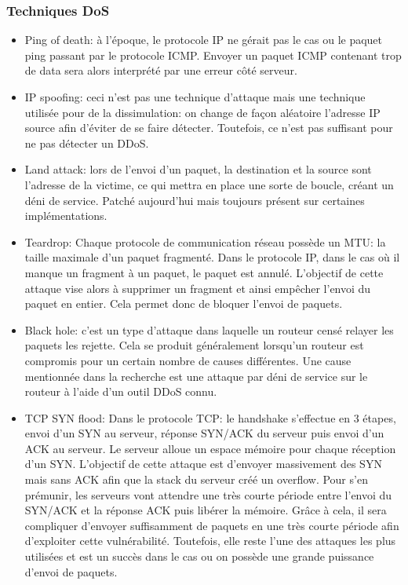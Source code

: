 \documentclass[12pt, oneside]{article}
\begin{document}
\subsubsection{Techniques DoS}
\begin{itemize}
\item Ping of death: à l'époque, le protocole IP ne gérait pas le cas ou le paquet ping passant par le protocole ICMP. Envoyer un paquet ICMP contenant trop de data sera alors interprété par une erreur côté serveur.
\item IP spoofing: ceci n'est pas une technique d'attaque mais une technique utilisée pour de la dissimulation: on change de façon aléatoire l'adresse IP source afin d'éviter de se faire détecter. Toutefois, ce n'est pas suffisant pour ne pas détecter un DDoS.
\item Land attack: lors de l'envoi d'un paquet, la destination et la source sont l'adresse de la victime, ce qui mettra en place une sorte de boucle, créant un déni de service. Patché aujourd'hui mais toujours présent sur certaines implémentations.
\item Teardrop: Chaque protocole de communication réseau possède un MTU: la taille maximale d'un paquet fragmenté. Dans le protocole IP, dans le cas où il manque un fragment à un paquet, le paquet est annulé. L'objectif de cette attaque vise alors à supprimer un fragment et ainsi empêcher l'envoi du paquet en entier. Cela permet donc de bloquer l'envoi de paquets.
\item Black hole: c'est un type d'attaque dans laquelle un routeur censé relayer les paquets les rejette. Cela se produit généralement lorsqu'un routeur est compromis pour un certain nombre de causes différentes. Une cause mentionnée dans la recherche est une attaque par déni de service sur le routeur à l'aide d'un outil DDoS connu.
\item TCP SYN flood: Dans le protocole TCP: le handshake s'effectue en 3 étapes, envoi d'un SYN au serveur, réponse SYN/ACK du serveur puis envoi d'un ACK au serveur. Le serveur alloue un espace mémoire pour chaque réception d'un SYN. L'objectif de cette attaque est d'envoyer massivement des SYN mais sans ACK afin que la stack du serveur créé un overflow. Pour s'en prémunir, les serveurs vont attendre une très courte période entre l'envoi du SYN/ACK et la réponse ACK puis libérer la mémoire. Grâce à cela, il sera compliquer d'envoyer suffisamment de paquets en une très courte période afin d'exploiter cette vulnérabilité. Toutefois, elle reste l'une des attaques les plus utilisées et est un succès dans le cas ou on possède une grande puissance d'envoi de paquets.

\end{itemize}
\end{document}
